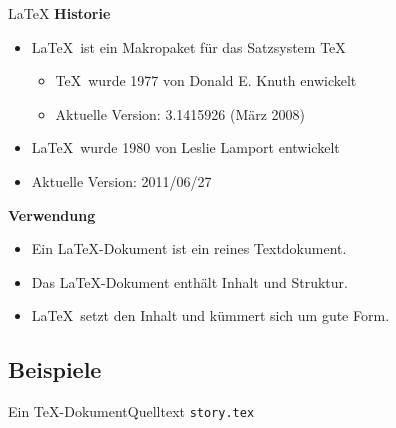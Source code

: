 
\begin{Frame}{\LaTeX}
  \textbf{\color{maincolor}Historie}
  \begin{itemize}
    \item \LaTeX\ ist ein Makropaket für das Satzsystem \TeX
      \begin{itemize}
        \item \TeX\ wurde 1977 von Donald E. Knuth enwickelt
        \item Aktuelle Version: 3.1415926 (März 2008)
      \end{itemize}
    \item \LaTeX\ wurde 1980 von Leslie Lamport entwickelt
    \item Aktuelle Version: 2011/06/27
  \end{itemize}

  \xxx
  \pause

  \textbf{\color{maincolor}Verwendung}
  \begin{itemize}
    \item Ein \LaTeX-Dokument ist ein \alert{reines Textdokument}.
    \item Das \LaTeX-Dokument enthält \alert{Inhalt und Struktur}.
    \item \LaTeX\ setzt den Inhalt und kümmert sich um \alert{gute Form}.
  \end{itemize}
\end{Frame}

\subsection{Beispiele}

\begin{Frame}{Ein \TeX-Dokument}{Quelltext \texttt{story.tex}}
  
\end{Frame}

